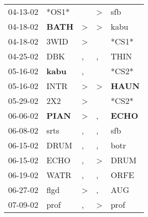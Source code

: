 \begin{supertabular}{p{0.07\textwidth}p{0.06\textwidth}p{0.02\textwidth}p{0.02\textwidth}p{0.06\textwidth}}
          04-13-02\textsuperscript{} &                            *OS1* &                  &     \textgreater &            sfb\textsuperscript{} \\
          04-18-02\textsuperscript{} &  \textbf{BATH\textsuperscript{}} &     \textgreater &     \textgreater &           kabu\textsuperscript{} \\
          04-18-02\textsuperscript{} &           3WID\textsuperscript{} &     \textgreater &                  &                            *CS1* \\
          04-25-02\textsuperscript{} &            DBK\textsuperscript{} &                , &                , &           THIN\textsuperscript{} \\
          05-16-02\textsuperscript{} &  \textbf{kabu\textsuperscript{}} &                , &                  &                            *CS2* \\
          05-16-02\textsuperscript{} &           INTR\textsuperscript{} &     \textgreater &     \textgreater &  \textbf{HAUN\textsuperscript{}} \\
          05-29-02\textsuperscript{} &            2X2\textsuperscript{} &     \textgreater &                  &                            *CS2* \\
          06-06-02\textsuperscript{} &  \textbf{PIAN\textsuperscript{}} &     \textgreater &                , &  \textbf{ECHO\textsuperscript{}} \\
          06-08-02\textsuperscript{} &           srts\textsuperscript{} &                , &                , &            sfb\textsuperscript{} \\
          06-15-02\textsuperscript{} &           DRUM\textsuperscript{} &                , &                , &           botr\textsuperscript{} \\
          06-15-02\textsuperscript{} &           ECHO\textsuperscript{} &                , &     \textgreater &           DRUM\textsuperscript{} \\
          06-19-02\textsuperscript{} &           WATR\textsuperscript{} &                , &                , &           ORFE\textsuperscript{} \\
          06-27-02\textsuperscript{} &           flgd\textsuperscript{} &     \textgreater &                , &            AUG\textsuperscript{} \\
          07-09-02\textsuperscript{} &           prof\textsuperscript{} &                , &     \textgreater &           prof\textsuperscript{} \\

\end{supertabular}
